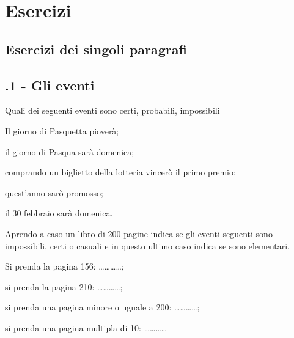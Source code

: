 \section{Esercizi}
\subsection{Esercizi dei singoli paragrafi}
\subsection*{\thechapter.1 - Gli eventi}

\begin{esercizio}
 \label{ese:9.1}
Quali dei seguenti eventi sono certi, probabili, impossibili
\begin{enumeratea}
\item Il giorno di Pasquetta pioverà;
\item il giorno di Pasqua sarà domenica;
\item comprando un biglietto della lotteria vincerò il primo premio;
\item quest'anno sarò promosso;
\item il 30 febbraio sarà domenica.
\end{enumeratea}
\end{esercizio}

\begin{esercizio}
 \label{ese:9.2}
Aprendo a caso un libro di 200 pagine indica se gli eventi seguenti sono impossibili, certi o casuali e in questo ultimo caso indica se sono elementari.
\begin{enumeratea}
\item Si prenda la pagina 156: \ldots\ldots\ldots\ldots;
\item si prenda la pagina 210: \ldots\ldots\ldots\ldots;
\item si prenda una pagina minore o uguale a 200: \ldots\ldots\ldots\ldots;
\item si prenda una pagina multipla di 10: \ldots\ldots\ldots\ldots
\end{enumeratea}
\end{esercizio}


